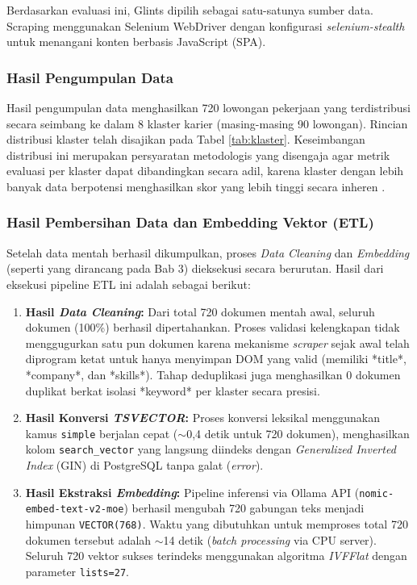 Berdasarkan evaluasi ini, Glints dipilih sebagai satu-satunya sumber data. Scraping
menggunakan Selenium WebDriver dengan konfigurasi \textit{selenium-stealth} untuk
menangani konten berbasis JavaScript (SPA).

\subsubsection{Hasil Pengumpulan Data}
Hasil pengumpulan data menghasilkan 720 lowongan pekerjaan yang terdistribusi secara
seimbang ke dalam 8 klaster karier (masing-masing 90 lowongan). Rincian distribusi klaster
telah disajikan pada Tabel \ref{tab:klaster}. Keseimbangan distribusi ini merupakan
persyaratan metodologis yang disengaja agar metrik evaluasi per klaster dapat
dibandingkan secara adil, karena klaster dengan lebih banyak data berpotensi
menghasilkan skor yang lebih tinggi secara inheren \cite{Cormack2009}.



\subsubsection{Hasil Pembersihan Data dan Embedding Vektor (ETL)}
Setelah data mentah berhasil dikumpulkan, proses \textit{Data Cleaning} dan \textit{Embedding} (seperti yang dirancang pada Bab 3) dieksekusi secara berurutan. Hasil dari eksekusi pipeline ETL ini adalah sebagai berikut:

\begin{enumerate}[noitemsep]
  \item \textbf{Hasil \textit{Data Cleaning}:} Dari total 720 dokumen mentah awal, seluruh dokumen (100\%) berhasil dipertahankan. Proses validasi kelengkapan tidak menggugurkan satu pun dokumen karena mekanisme \textit{scraper} sejak awal telah diprogram ketat untuk hanya menyimpan DOM yang valid (memiliki *title*, *company*, dan *skills*). Tahap deduplikasi juga menghasilkan 0 dokumen duplikat berkat isolasi *keyword* per klaster secara presisi.
  \item \textbf{Hasil Konversi \textit{TSVECTOR}:} Proses konversi leksikal menggunakan kamus \texttt{simple} berjalan cepat ($\sim$0,4 detik untuk 720 dokumen), menghasilkan kolom \texttt{search\_vector} yang langsung diindeks dengan \textit{Generalized Inverted Index} (GIN) di PostgreSQL tanpa galat (\textit{error}).
  \item \textbf{Hasil Ekstraksi \textit{Embedding}:} Pipeline inferensi via Ollama API (\texttt{nomic-embed-text-v2-moe}) berhasil mengubah 720 gabungan teks menjadi himpunan \texttt{VECTOR(768)}. Waktu yang dibutuhkan untuk memproses total 720 dokumen tersebut adalah $\sim$14 detik (\textit{batch processing} via CPU server). Seluruh 720 vektor sukses terindeks menggunakan algoritma \textit{IVFFlat} dengan parameter \texttt{lists=27}.
\end{enumerate}

